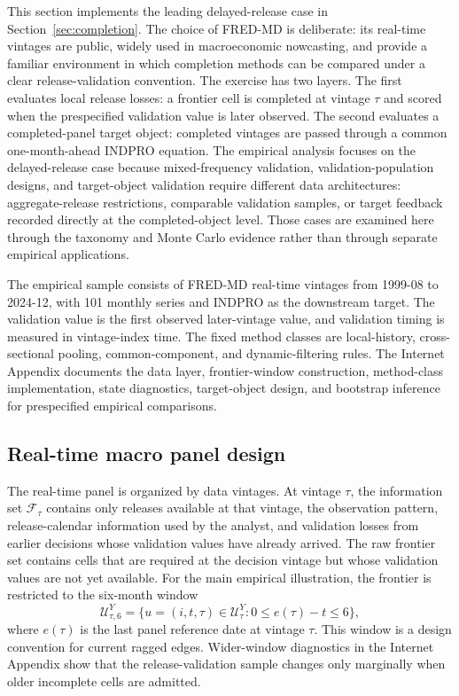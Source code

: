 \documentclass[a4paper, 12pt]{article}
\theoremstyle{plain}
\theoremstyle{remark}
\newcommand{\Ucal}{\mathcal{U}}
\newcommand{\Fcal}{\mathcal{F}}
\newcommand{\1}{\mathbf{1}}
\begin{document}
This section implements the leading delayed-release case in Section~\ref{sec:completion}. The choice of FRED-MD is deliberate: its real-time vintages are public, widely used in macroeconomic nowcasting, and provide a familiar environment in which completion methods can be compared under a clear release-validation convention. The exercise has two layers. The first evaluates local release losses: a frontier cell is completed at vintage \(\tau\) and scored when the prespecified validation value is later observed. The second evaluates a completed-panel target object: completed vintages are passed through a common one-month-ahead INDPRO equation. The empirical analysis focuses on the delayed-release case because mixed-frequency validation, validation-population designs, and target-object validation require different data architectures: aggregate-release restrictions, comparable validation samples, or target feedback recorded directly at the completed-object level. Those cases are examined here through the taxonomy and Monte Carlo evidence rather than through separate empirical applications.

The empirical sample consists of FRED-MD real-time vintages from 1999-08 to 2024-12, with 101 monthly series and INDPRO as the downstream target. The validation value is the first observed later-vintage value, and validation timing is measured in vintage-index time. The fixed method classes are local-history, cross-sectional pooling, common-component, and dynamic-filtering rules. The Internet Appendix documents the data layer, frontier-window construction, method-class implementation, state diagnostics, target-object design, and bootstrap inference for prespecified empirical comparisons.

\subsection{Real-time macro panel design}
\label{subsec:fred-design}

The real-time panel is organized by data vintages. At vintage \(\tau\), the information set \(\Fcal_\tau\) contains only releases available at that vintage, the observation pattern, release-calendar information used by the analyst, and validation losses from earlier decisions whose validation values have already arrived. The raw frontier set contains cells that are required at the decision vintage but whose validation values are not yet available. For the main empirical illustration, the frontier is restricted to the six-month window
\[
\Ucal^Y_{\tau,6}
=
\{u=(i,t,\tau)\in\Ucal^Y_\tau:0\leq e(\tau)-t\leq 6\},
\]
where \(e(\tau)\) is the last panel reference date at vintage \(\tau\). This window is a design convention for current ragged edges. Wider-window diagnostics in the Internet Appendix show that the release-validation sample changes only marginally when older incomplete cells are admitted.
\end{document}
